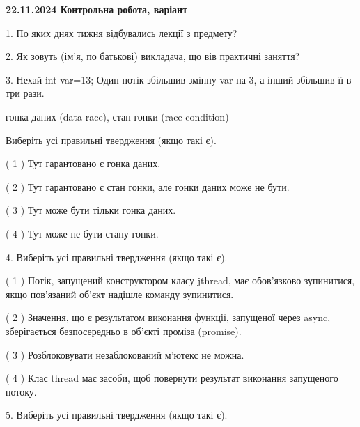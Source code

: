 \documentclass[12pt, ukrainian]{article}
\begin{document}
\vspace{4mm}
\newpage
\begin {large}

\textbf{22.11.2024 Контрольна робота, варіант  }\par


{
1. По яких днях тижня відбувались лекції з предмету?



\vspace{5mm}
2. Як зовуть (ім'я, по батькові) викладача, що вів практичні заняття?



\vspace{5mm}
3. Нехай int var=13; Один потік збільшив змінну var на 3, а інший збільшив її в три рази.

гонка даних (data race), стан гонки (race condition)

Виберіть усі правильні твердження (якщо такі є).\par
\vspace{2mm}
( 1 ) Тут гарантовано є гонка даних.%

( 2 ) Тут гарантовано є стан гонки, але гонки даних може не бути.%

( 3 ) Тут може бути тільки гонка даних.%

( 4 ) Тут може не бути стану гонки.%


\vspace{5mm}
4. Виберіть усі правильні твердження (якщо такі є).\par
\vspace{2mm}

( 1 ) Потік, запущений конструктором класу jthread, має обов’язково зупинитися, якщо пов’язаний об’єкт надішле команду зупинитися.%

( 2 ) Значення, що є результатом виконання функції, запущеної через async, зберігається безпосередньо в об’єкті проміза (promise).%

( 3 ) Розблоковувати незаблокований м’ютекс не можна.%

( 4 ) Клас thread має засоби, щоб повернути результат виконання запущеного потоку.%


\vspace{5mm}
5. Виберіть усі правильні твердження (якщо такі є).\par
\vspace{2mm}

}
\end{large}
\end{document}
